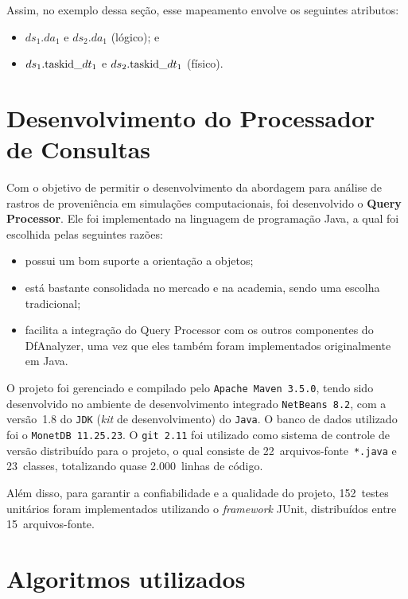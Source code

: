 Assim, no exemplo dessa seção, esse mapeamento envolve os seguintes atributos:

\begin{itemize}
    \item \(ds_1.da_1\) e \(ds_2.da_1\) (lógico); e
    \item \(ds_1.\textup{taskid\_}dt_1\) e \(ds_2.\textup{taskid\_}dt_1\) (físico).
\end{itemize}

\section{Desenvolvimento do Processador de Consultas}

Com o objetivo de permitir o desenvolvimento da abordagem para análise de rastros de proveniência em simulações computacionais, foi desenvolvido o \textbf{Query Processor}. Ele foi implementado na linguagem de programação Java, a qual foi escolhida pelas seguintes razões:

\begin{itemize}
    \item possui um bom suporte a orientação a objetos;
    \item está bastante consolidada no mercado e na academia, sendo uma escolha tradicional;
    \item facilita a integração do Query Processor com os outros componentes do DfAnalyzer, uma vez que eles também foram implementados originalmente em Java.
\end{itemize}

O projeto foi gerenciado e compilado pelo \texttt{Apache Maven~3.5.0}, tendo sido desenvolvido no ambiente de desenvolvimento integrado \texttt{NetBeans~8.2}, com a versão~1.8 do \texttt{JDK} (\textit{kit} de desenvolvimento) do \texttt{Java}. O banco de dados utilizado foi o \texttt{MonetDB~11.25.23}. O \texttt{git~2.11} foi utilizado como sistema de controle de versão distribuído para o projeto, o qual consiste de
22~arquivos-fonte~\texttt{*.java} e 23~classes, totalizando quase 2.000~linhas de código.

Além disso, para garantir a confiabilidade e a qualidade do projeto, 152~testes unitários foram implementados utilizando o \textit{framework} JUnit, distribuídos entre 15~arquivos-fonte.

\section{Algoritmos utilizados}%
\label{sec:algoritmos-utilizados}

